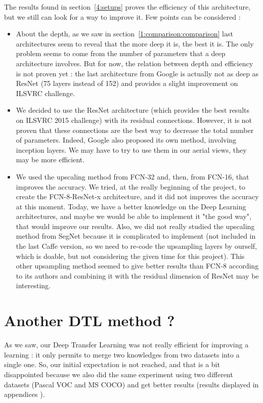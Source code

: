 The results found in section~\ref{4:setups} proves the efficiency of this architecture, but we still can look for a way to improve it. Few points can be considered :
\begin{itemize}
\item About the depth, as we saw in section~\ref{1:comparison:comparison} last architectures seem to reveal that the more deep it is, the best it is. The only problem seems to come from the number of parameters that a deep architecture involves. But for now, the relation between depth and efficiency is not proven yet : the last architecture from Google is actually not as deep as ResNet (75 layers instead of 152) and provides a slight improvement on ILSVRC challenge.
\item We decided to use the ResNet architecture (which provides the best results on ILSVRC 2015 challenge) with its residual connections. However, it is not proven that these connections are the best way to decrease the total number of parameters. Indeed, Google also proposed its own method, involving inception layers. We may have to try to use them in our aerial views, they may be more efficient.
\item We used the upscaling method from FCN-32 and, then, from FCN-16, that improves the accuracy. We tried, at the really beginning of the project, to create the FCN-8-ResNet-x architecture, and it did not improves the accuracy at this moment. Today, we have a better knowledge on the Deep Learning architectures, and maybe we would be able to implement it "the good way", that would improve our results. Also, we did not really studied the upscaling method from SegNet because it is complicated to implement (not included in the last Caffe version, so we need to re-code the upsampling layers by ourself, which is doable, but not considering the given time for this project). This other upsampling method seemed to give better results than FCN-8 according to its authors and combining it with the residual dimension of ResNet may be interesting.
\end{itemize}



\section{Another DTL method ?}
As we saw, our Deep Transfer Learning was not really efficient for improving a learning : it only permits to merge two knowledges from two datasets into a single one. So, our initial expectation is not reached, and that is a bit disappointed because we also did the same experiment using two different datasets (Pascal VOC and MS COCO) and get better results (results displayed in appendices ).

